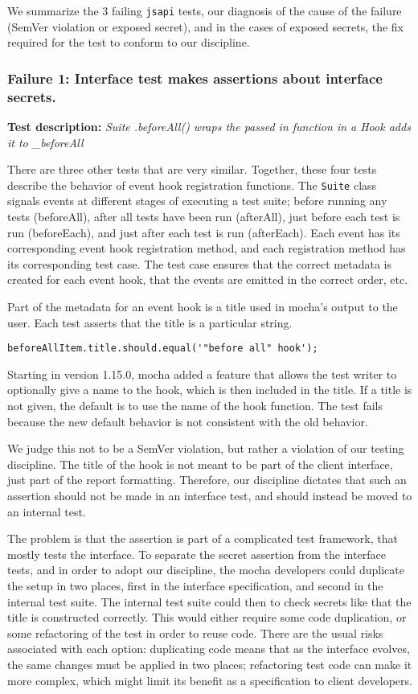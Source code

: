 We summarize the 3 failing {\tt jsapi} tests, our diagnosis of the cause of
the failure (SemVer violation or exposed secret), and in the cases of
exposed secrets, the fix required for the test to conform to our
discipline.

\subsubsection{Failure 1: Interface test makes assertions about
interface secrets.}
{\bf Test description: } {\em Suite .beforeAll() wraps the passed in
function in a Hook adds it to \_beforeAll}
\label{sec:failure1}

There are three other tests that are very similar. Together, these
four tests describe the behavior of event hook registration
functions. The {\tt Suite} class signals events at different stages of
executing a test suite; before running any tests (beforeAll), after
all tests have been run (afterAll), just before each test is run
(beforeEach), and just after each test is run (afterEach). Each event
has its corresponding event hook registration method, and each
registration method has its corresponding test case. The test case
ensures that the correct metadata is created for each event hook, that
the events are emitted in the correct order, etc.

Part of the metadata for an event hook is a title used in mocha's
output to the user. Each test asserts that the title is a particular
string.

{\small
\begin{verbatim}
beforeAllItem.title.should.equal('"before all" hook');
\end{verbatim}
}

Starting in version 1.15.0, mocha added a feature that allows the test
writer to optionally give a name to the hook, which is then included
in the title. If a title is not given, the default is to use the name
of the hook function. The test fails because the new default behavior
is not consistent with the old behavior.

We judge this not to be a SemVer violation, but rather a violation of
our testing discipline. The title of the hook is not meant to be part
of the client interface, just part of the report
formatting. Therefore, our discipline dictates that such an assertion
should not be made in an interface test, and should instead be moved
to an internal test.

The problem is that the assertion is part of a complicated test
framework, that mostly tests the interface. To separate the
secret assertion from the interface tests, and in order to adopt our
discipline, the mocha developers could duplicate the setup in two places,
first in the interface specification, and second in the
internal test suite. The internal test suite could then to check secrets
like that the title is constructed correctly. This would either require
some code duplication, or some refactoring of the test in order to reuse
code. There are the usual risks associated with each option: duplicating
code means that as the interface evolves, the same changes must be
applied in two places; refactoring test code can make it more complex,
which might limit its benefit as a specification to client developers.


